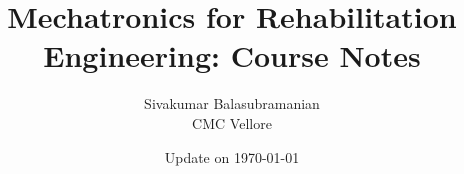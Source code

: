 \documentclass[12pt,twoside]{book}
\begin{document}
\title{\bf \huge Mechatronics for Rehabilitation Engineering: Course Notes}
\author{Sivakumar Balasubramanian \\ CMC Vellore}
\date{Update on \today}
\maketitle
\setcounter{tocdepth}{2}
\setcounter{minitocdepth}{1} 

\begin{multicols}{2}
    \dominitoc%
    \adjustmtc[2]%
    {\footnotesize %
      \tableofcontents
      \label{toc-contents}
    }
\end{multicols}

\listoffigures

\printglossary


% 






% 
% 
% 
% 
% 
\end{document}
